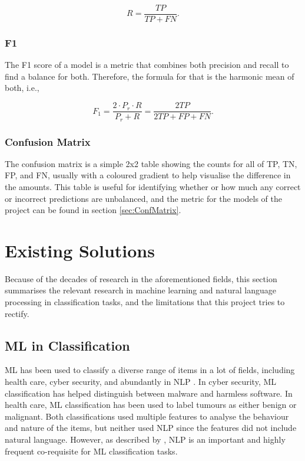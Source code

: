 \documentclass{l4proj}
\begin{document}
\[R=\frac{TP}{TP+FN}.\]

\subsubsection{F1}
\label{subsubsec:F1}

The F1 score of a model is a metric that combines both precision and recall to find a balance for both. Therefore, the formula for that is the harmonic mean of both, i.e., 

\[F_1=\frac{2\cdot P_r\cdot R}{P_r + R}=\frac{2TP}{2TP + FP + FN}.\]

\subsubsection{Confusion Matrix}
\label{subsec:conf_matrix}

The confusion matrix is a simple 2x2 table showing the counts for all of TP, TN, FP, and FN, usually with a coloured gradient to help visualise the difference in the amounts. This table is useful for identifying whether or how much any correct or incorrect predictions are unbalanced, and the metric for the models of the project can be found in section \ref{sec:ConfMatrix}.

\section{Existing Solutions}

Because of the decades of research in the aforementioned fields, this section summarises the relevant research in machine learning and natural language processing in classification tasks, and the limitations that this project tries to rectify.

\subsection{ML in Classification}

ML has been used to classify a diverse range of items in a lot of fields, including health care, cyber security, and abundantly in NLP \citep{MLApps}. In cyber security, ML classification has helped distinguish between malware and harmless software. In health care, ML classification has been used to label tumours as either benign or malignant. Both classifications used multiple features to analyse the behaviour and nature of the items, but neither used NLP since the features did not include natural language. However, as described by \citeauthor{MLApps}, NLP is an important and highly frequent co-requisite for ML classification tasks.
\end{document}
